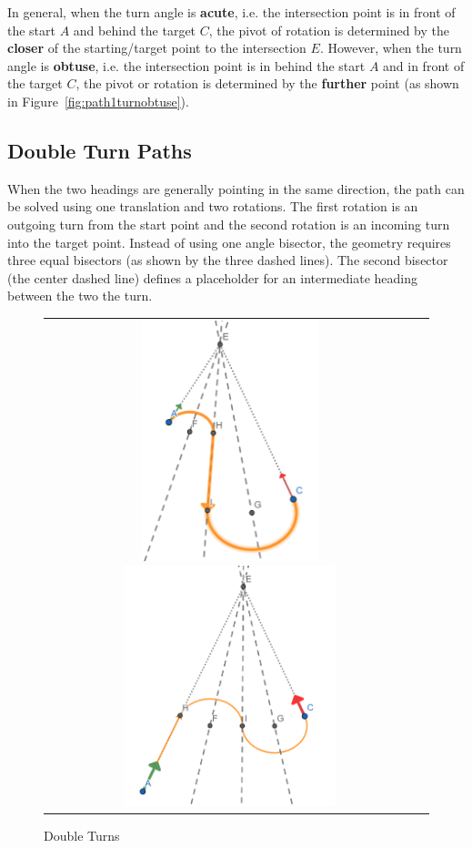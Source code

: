 \documentclass{article}
\begin{document}
In general, when the turn angle is \textbf{acute}, 
i.e. the intersection point is in front of the start $A$ and behind the target $C$, 
the pivot of rotation is determined by the \textbf{closer}
of the starting/target point to the intersection $E$.
However, when the turn angle is \textbf{obtuse}, i.e. the intersection point is in behind the start $A$ and in front of the target $C$, 
the pivot or rotation is determined by the \textbf{further}
point (as shown in Figure~\ref{fig:path1turnobtuse}).

\clearpage
\subsection*{Double Turn Paths}
When the two headings are generally pointing in the same direction, the path can be solved using one translation
and two rotations. The first rotation is an outgoing turn from the start point and the second rotation is
an incoming turn into the target point.
Instead of using one angle bisector, the geometry requires three equal bisectors (as shown by 
the three dashed lines). The second bisector (the center dashed line) defines a placeholder for an intermediate heading 
between the two the turn.

\begin{figure}[hbt]
  \begin{tabular}{cc}
    \includegraphics[height=7cm]{screenshots/double-acute-turn-rot-trans.png}
    \includegraphics[height=7cm]{screenshots/double-acute-turn-trans-rot.png}
  \end{tabular}
  \caption{Double Turns}
  \label{fig:path2turns}
\end{figure}
\end{document}
